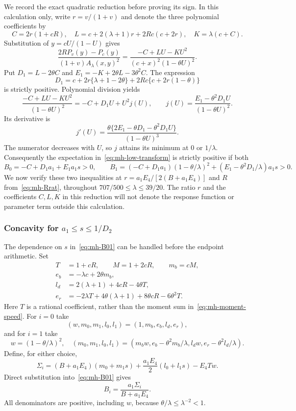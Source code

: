 We record the exact quadratic reduction before proving its sign. In this calculation only, write $r=v/(1+v)$ and denote the three polynomial coefficients by
\[
 C=2r(1+cR),\quad
 L=c+2(\lambda+1)r+2Rc(c+2r),\quad K=\lambda(c+C).
\]
Substitution of $y=cU/(1-U)$ gives
\begin{equation}\label{eq:mh-low-transform}
 \frac{2RP_v(y)-P_c(y)}{(1+v)A_\lambda(x,y)^2}
 =\frac{-C+LU-KU^2}{(c+x)^2(1-\theta U)^2}.
\end{equation}
Put $D_1=L-2\theta C$ and $E_1=-K+2\theta L-3\theta^2C$. The expression
\[
 D_1=c+2r\{\lambda+1-2\theta\}+2Rc\{c+2r(1-\theta)\}
\]
is strictly positive. Polynomial division yields
\[
 \frac{-C+LU-KU^2}{(1-\theta U)^2}
 =-C+D_1U+U^2j(U),\qquad
 j(U)=\frac{E_1-\theta^2D_1U}{(1-\theta U)^2}.
\]
Its derivative is
\[
 j'(U)=\frac{\theta\{2E_1-\theta D_1-\theta^2D_1U\}}{(1-\theta U)^3}.
\]
The numerator decreases with $U$, so $j$ attains its minimum at $0$ or $1/\lambda$. Consequently the expectation in~\eqref{eq:mh-low-transform} is strictly positive if both
\begin{equation}\label{eq:mh-B01}
 B_0=-C+D_1a_1+E_1a_1s>0,\qquad
 B_1=(-C+D_1a_1)(1-\theta/\lambda)^2
             +(E_1-\theta^2D_1/\lambda)a_1s>0.
\end{equation}
We now verify these two inequalities at $r=a_1E_4/[2(B+a_1E_4)]$ and $R$ from~\eqref{eq:mh-Rrat}, throughout $707/500\le\lambda\le39/20$. The ratio $r$ and the coefficients $C,L,K$ in this reduction will not denote the response function or parameter term outside this calculation.

\subsubsection{Concavity for \texorpdfstring{$a_1\le s\le1/D_2$}{a1 <= s <= 1/D2}}
The dependence on $s$ in~\eqref{eq:mh-B01} can be handled before the endpoint arithmetic. Set
\begin{align*}
 T&=1+cR,\qquad M=1+2cR,\qquad m_b=cM,\\
 e_b&=-\lambda c+2\theta m_b,\\
 l_d&=2(\lambda+1)+4cR-4\theta T,\\
 e_r&=-2\lambda T+4\theta(\lambda+1)+8\theta cR-6\theta^2T.
\end{align*}
Here $T$ is a rational coefficient, rather than the moment sum in~\eqref{eq:mh-moment-speed}. For $i=0$ take
\[
 (w,m_0,m_1,l_0,l_1)=(1,m_b,e_b,l_d,e_r),
\]
and for $i=1$ take
\[
 w=(1-\theta/\lambda)^2,\quad
 (m_0,m_1,l_0,l_1)
 =(m_bw,e_b-\theta^2m_b/\lambda,l_dw,e_r-\theta^2l_d/\lambda).
\]
Define, for either choice,
\begin{equation}\label{eq:mh-hybrid-sigma}
 \Sigma_i=(B+a_1E_4)(m_0+m_1s)
               +\frac{a_1E_4}{2}(l_0+l_1s)-E_4Tw.
\end{equation}
Direct substitution into~\eqref{eq:mh-B01} gives
\begin{equation}\label{eq:mh-hybrid-normalization}
 B_i=\frac{a_1\Sigma_i}{B+a_1E_4}.
\end{equation}
All denominators are positive, including $w$, because $\theta/\lambda\le\lambda^{-2}<1$.

